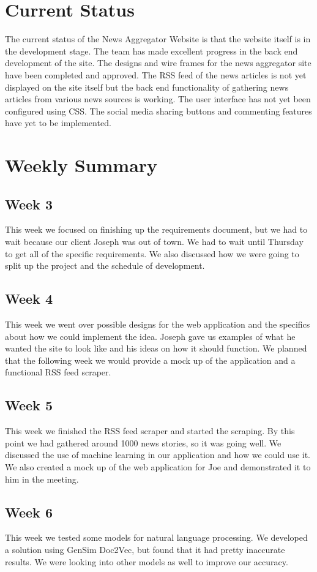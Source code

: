\documentclass[onecolumn, draftclsnofoot,10pt, compsoc]{IEEEtran}
\begin{document}
\section{Current Status}
The current status of the News Aggregator Website is that the website itself is in the development stage. The team has made excellent progress in the back end development of the site. The designs and wire frames for the news aggregator site have been completed and approved. The RSS feed of the news articles is not yet displayed on the site itself but the back end functionality of gathering news articles from various news sources is working. The user interface has not yet been configured using CSS. The social media sharing buttons and commenting features have yet to be implemented. 

\section{Weekly Summary}
\subsection{Week 3}
This week we focused on finishing up the requirements document, but we had to wait because our client Joseph was out of town. We had to wait until Thursday to get all of the specific requirements. We also discussed how we were going to split up the project and the schedule of development.
\subsection{Week 4}
This week we went over possible designs for the web application and the specifics about how we could implement the idea. Joseph gave us examples of what he wanted the site to look like and his ideas on how it should function. We planned that the following week we would provide a mock up of the application and a functional RSS feed scraper.
\subsection{Week 5}
This week we finished the RSS feed scraper and started the scraping. By this point we had gathered around 1000 news stories, so it was going well. We discussed the use of machine learning in our application and how we could use it. We also created a mock up of the web application for Joe and demonstrated it to him in the meeting.
\subsection{Week 6}
This week we tested some models for natural language processing. We developed a solution using GenSim Doc2Vec, but found that it had pretty inaccurate results. We were looking into other models as well to improve our accuracy. 
\end{document}
